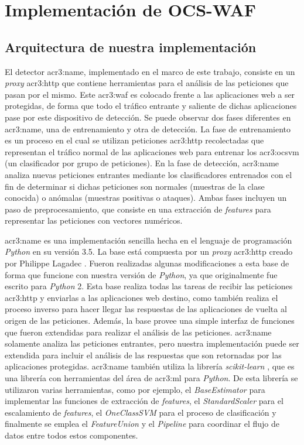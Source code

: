 \section{Implementación de OCS-WAF}
\label{chap:p3_new_waf}

\subsection{Arquitectura de nuestra implementación}

El detector \gls{acr3:name}, implementado en el marco de este trabajo,
consiste en un \textit{proxy} \gls{acr3:http} que contiene herramientas
para el análisis de las peticiones que pasan por el mismo.
Este \gls{acr3:waf} es colocado frente a las aplicaciones web a ser
protegidas, de forma que todo el tráfico entrante y saliente de dichas
aplicaciones pase por este dispositivo de detección.
Se puede observar dos fases diferentes en \gls{acr3:name}, una de
entrenamiento y otra de detección. La fase de entrenamiento es un proceso
en el cual se utilizan peticiones \gls{acr3:http} recolectadas que
representan el tráfico normal de las aplicaciones web para entrenar
los \gls{acr3:ocsvm} (un clasificador por grupo de peticiones).
En la fase de detección, \gls{acr3:name} analiza nuevas peticiones
entrantes mediante los clasificadores entrenados con el fin de determinar
si dichas peticiones son normales (muestras de la clase conocida) o
anómalas (muestras positivas o ataques).
Ambas fases incluyen un paso de preprocesamiento, que consiste en una
extracción de \textit{features} para representar las peticiones con
vectores numéricos.

\gls{acr3:name} es una implementación sencilla hecha en el lenguaje
de programación \textit{Python} en su versión 3.5.
La base está compuesta por un \textit{proxy} \gls{acr3:http} creado por
Philippe Lagadec \cite{cherryproxy2011}. Fueron realizadas algunas
modificaciones a esta base de forma que funcione con nuestra versión de
\textit{Python}, ya que originalmente fue escrito para \textit{Python} 2.
Esta base realiza todas las tareas de recibir las peticiones \gls{acr3:http}
y enviarlas a las aplicaciones web destino, como también realiza el proceso
inverso para hacer llegar las respuestas de las aplicaciones de vuelta
al origen de las peticiones. Además, la base provee una simple interfaz
de funciones que fueron extendidas para realizar el análisis de las
peticiones.
\gls{acr3:name} solamente analiza las peticiones entrantes, pero nuestra
implementación puede ser extendida para incluir el análisis de las respuestas
que son retornadas por las aplicaciones protegidas.
\gls{acr3:name} también utiliza la librería \textit{scikit-learn}
\cite{scikit-learn}, que es una librería con herramientas del área de
\gls{acr3:ml} para \textit{Python}. De esta librería se utilizaron varias
herramientas, como por ejemplo, el \textit{BaseEstimator} para implementar
las funciones de extracción de \textit{features}, el \textit{StandardScaler}
para el escalamiento de \textit{features}, el \textit{OneClassSVM} para
el proceso de clasificación y finalmente se emplea el \textit{FeatureUnion}
y el \textit{Pipeline} para coordinar el flujo de datos entre todos estos
componentes.


